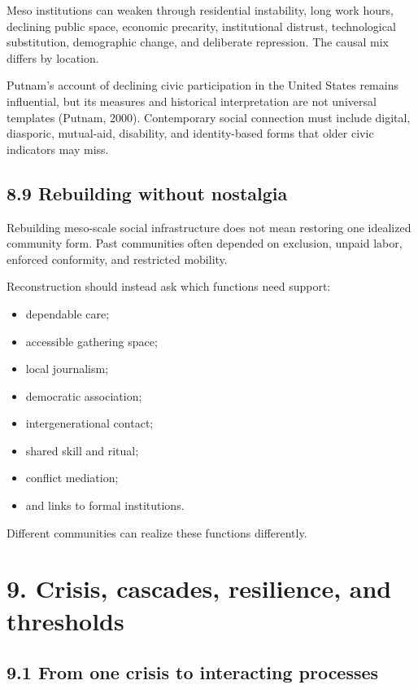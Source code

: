 \documentclass[
  11pt,
]{article}
\providecommand{\tightlist}{%
  \setlength{\itemsep}{0pt}\setlength{\parskip}{0pt}}
\begin{document}
Meso institutions can weaken through residential instability, long work
hours, declining public space, economic precarity, institutional
distrust, technological substitution, demographic change, and deliberate
repression. The causal mix differs by location.

Putnam's account of declining civic participation in the United States
remains influential, but its measures and historical interpretation are
not universal templates (Putnam, 2000). Contemporary social connection
must include digital, diasporic, mutual-aid, disability, and
identity-based forms that older civic indicators may miss.

\subsection{8.9 Rebuilding without
nostalgia}\label{rebuilding-without-nostalgia}

Rebuilding meso-scale social infrastructure does not mean restoring one
idealized community form. Past communities often depended on exclusion,
unpaid labor, enforced conformity, and restricted mobility.

Reconstruction should instead ask which functions need support:

\begin{itemize}
\tightlist
\item
  dependable care;
\item
  accessible gathering space;
\item
  local journalism;
\item
  democratic association;
\item
  intergenerational contact;
\item
  shared skill and ritual;
\item
  conflict mediation;
\item
  and links to formal institutions.
\end{itemize}

Different communities can realize these functions differently.

\section{9. Crisis, cascades, resilience, and
thresholds}\label{crisis-cascades-resilience-and-thresholds}

\subsection{9.1 From one crisis to interacting
processes}\label{from-one-crisis-to-interacting-processes}
\end{document}
